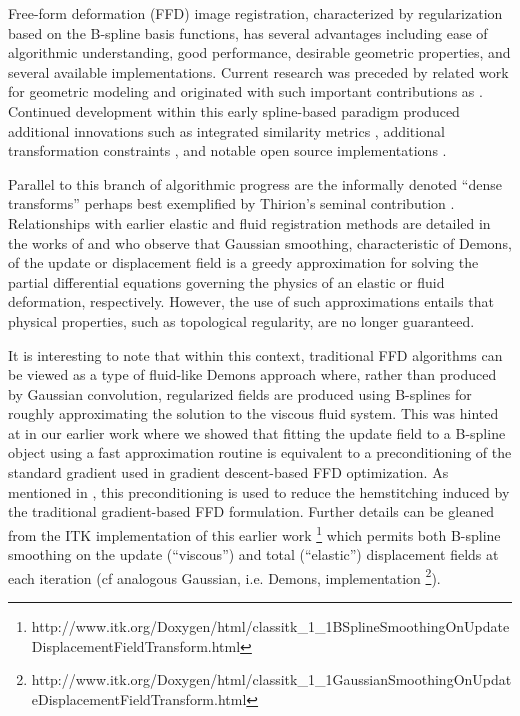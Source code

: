 \documentclass{frontiersSCNS}
\begin{document}
Free-form deformation (FFD) image registration, characterized by  regularization based on the B-spline basis functions, has several 
advantages including ease of algorithmic understanding, 
good performance, desirable geometric properties, and several available 
implementations.  Current research was preceded by related work for
geometric modeling \citep{sederberg1986} and originated with such important
contributions as \cite{szeliski1997,thevenaz1998,rueckert1999}.  
Continued development within this early spline-based paradigm produced additional innovations such as integrated similarity metrics \citep[e.g.][]{mattes2003}, additional transformation constraints \citep[e.g.][]{rohlfing2003}, and notable open source implementations \citep[e.g.][]{ibanez2005,klein2010,shackleford2010}.

Parallel to this branch of algorithmic progress are the informally 
denoted ``dense transforms''
perhaps best exemplified by Thirion's seminal contribution \citep{thirion1998}.
Relationships with earlier elastic \citep{bajcsy1989,gee1993} and fluid \citep{christensen1996} registration methods are detailed in 
the works of \cite{bro-nielsen1996} and \cite{pennec1999} who observe that
Gaussian smoothing, characteristic of Demons, of the update or displacement
field is a greedy approximation for solving the partial differential equations governing
the physics of an elastic or fluid deformation, respectively.  However, the use of such 
approximations entails that physical properties, such as topological
regularity, are no longer guaranteed.
 
It is interesting to note that within this context, traditional FFD algorithms
can be viewed as a type of fluid-like Demons approach 
where, rather than produced by Gaussian convolution, regularized fields are produced using B-splines for roughly approximating the solution to the viscous fluid system.  This was hinted at in our earlier work \citep{tustison2009} where we showed that fitting the update field to a B-spline object using a fast approximation routine \citep{tustison2006} is equivalent to a preconditioning of the standard gradient used in gradient descent-based FFD optimization.  As mentioned in \cite{tustison2009}, this preconditioning is used to reduce the hemstitching induced by the traditional gradient-based FFD formulation.
Further details can be gleaned from the ITK implementation of this 
earlier work%
\footnote{
http://www.itk.org/Doxygen/html/classitk\_1\_1BSplineSmoothingOnUpdateDisplacementFieldTransform.html
}
which permits both B-spline smoothing on the update (``viscous'') and total (``elastic'') 
displacement fields at each iteration (cf
analogous Gaussian, i.e. Demons, implementation%
\footnote{
http://www.itk.org/Doxygen/html/classitk\_1\_1GaussianSmoothingOnUpdateDisplacementFieldTransform.html
}).
\end{document}
